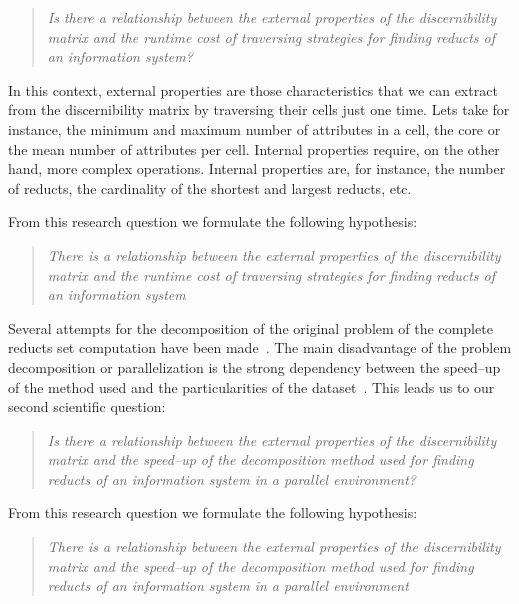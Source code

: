 \documentclass[authoryear,11pt]{elsarticle}
\begin{document}
\begin{quote}
  \emph{Is there a relationship between the external properties of the discernibility matrix and the runtime 
  		cost of traversing strategies for finding reducts of an information system?}
\end{quote}
  		
  In this context, external properties are those characteristics that we can extract from the discernibility
  matrix by traversing their cells just one time. Lets take for instance, the minimum and maximum number of
  attributes in a cell, the core or the mean number of attributes per cell. Internal properties require, on 
  the other hand, more complex operations. Internal properties are, for instance, the number of reducts, the
  cardinality of the shortest and largest reducts, etc.
  
  From this research question we formulate the following hypothesis:
  
\begin{quote}  
  \emph{There is a relationship between the external properties of the discernibility matrix and the runtime 
  		cost of traversing strategies for finding reducts of an information system}
\end{quote}
  		
  Several attempts for the decomposition of the original problem of the complete reducts set computation have 
  been made~\citep{Strakowski08,Jiao10,Kopczynski14}. The main disadvantage of the problem decomposition or
  parallelization is the strong dependency between the speed--up of the method used and the particularities of 
  the dataset~\citep{Strakowski08}. This leads us to our second scientific question:
  
\begin{quote}
  \emph{Is there a relationship between the external properties of the discernibility matrix and the 
  		speed--up of the decomposition method used for finding reducts of an information system 
  		in a parallel environment?}
\end{quote}

  From this research question we formulate the following hypothesis:
    
\begin{quote}
  \emph{There is a relationship between the external properties of the discernibility matrix and the 
  		speed--up of the decomposition method used for finding reducts of an information
  		system in a parallel environment}
\end{quote}
  
\end{document}
